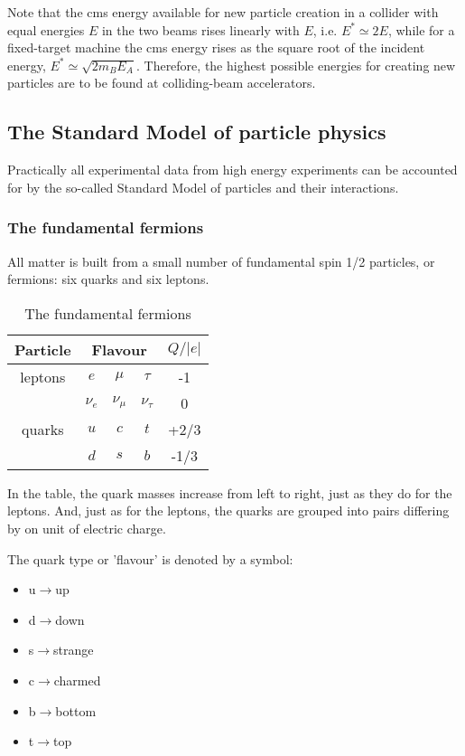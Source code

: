 \documentclass[en, device=normal]{elegantnote}
\begin{document}
Note that the cms energy available for new particle creation in a collider with equal energies 
$E$ in the two beams rises linearly with $E$, i.e. $E^*\simeq 2E$, while for a fixed-target 
machine the cms energy rises as the square root of the incident energy, $E^*\simeq\sqrt{2m_BE_A}$. 
Therefore, the highest possible energies for creating new particles are to be found at 
colliding-beam accelerators.

\subsection{The Standard Model of particle physics}

Practically all experimental data from high energy experiments can be accounted for 
by the so-called Standard Model of particles and their interactions.

\subsubsection{The fundamental fermions}

All matter is built from a small number of fundamental spin 1/2 particles, or fermions: 
six quarks and six leptons.

\begin{table}[h]
  \centering
  \caption{The fundamental fermions}
  \begin{tabular}{ccccc}
    \toprule
    Particle & \multicolumn{3}{c}{Flavour} & $Q/\vert e\vert$ \\
    \midrule
    leptons & $e$ & $\mu$ & $\tau$ & -1 \\
            & $\nu_e$ & $\nu_\mu$ & $\nu_\tau$ & 0 \\
    quarks & $u$ & $c$ & $t$ & +2/3 \\
           & $d$ & $s$ & $b$ & -1/3 \\
    \bottomrule
  \end{tabular}
\end{table}

In the table, the quark masses increase from left to right, just as they do for the 
leptons. And, just as for the leptons, the quarks are grouped into pairs differing 
by on unit of electric charge.

The quark type or 'flavour' is denoted by a symbol:
\begin{itemize}
  \item u$\rightarrow$up 
  \item d$\rightarrow$down 
  \item s$\rightarrow$strange 
  \item c$\rightarrow$charmed 
  \item b$\rightarrow$bottom 
  \item t$\rightarrow$top
\end{itemize}
\end{document}
